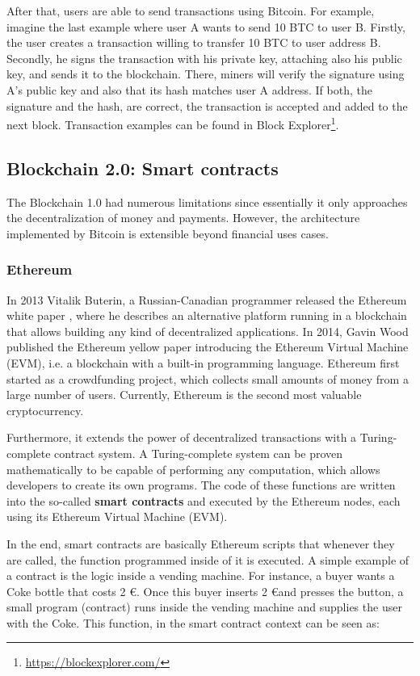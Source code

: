 After that, users are able to send transactions using Bitcoin. For example, imagine the last example where user A wants to send 10 BTC to user B. Firstly, the user creates a transaction willing to transfer 10 BTC to user address B. Secondly, he signs the transaction with his private key, attaching also his public key, and sends it to the blockchain. There, miners will verify the signature using A's public key and also that its hash matches user A address. If both, the signature and the hash, are correct, the transaction is accepted and added to the next block. Transaction examples can be found in Block Explorer\footnote{\url{https://blockexplorer.com/}}.

\subsection{Blockchain 2.0: Smart contracts} \label{smartContracts}

The Blockchain 1.0 had numerous limitations since essentially it only approaches the decentralization of money and payments. However, the architecture implemented by Bitcoin is extensible beyond financial uses cases.

\subsubsection{Ethereum}

In 2013 Vitalik Buterin, a Russian-Canadian programmer released the Ethereum white paper \cite{buterin2014next}, where he describes an alternative platform running in a blockchain that allows building any kind of decentralized applications. In 2014, Gavin Wood published the Ethereum
yellow paper introducing the Ethereum Virtual Machine (EVM), i.e. a blockchain with a built-in programming language. Ethereum first started as a crowdfunding project, which collects small amounts of money from a large number of users. Currently, Ethereum is the second most valuable cryptocurrency.

Furthermore, it extends the power of decentralized transactions with a Turing-complete contract system. A Turing-complete system can be proven mathematically to be capable of performing any computation, which allows developers to create its own programs. The code of these functions are written into the so-called \textbf{smart contracts} and executed by the Ethereum nodes, each using its Ethereum Virtual Machine (EVM).

In the end, smart contracts are basically Ethereum scripts that whenever they are called, the function programmed inside of it is executed. A simple example of a contract is the logic inside a vending machine. For instance, a buyer wants a Coke bottle that costs 2 \euro. Once this buyer inserts 2 \euro and presses the button, a small program (contract) runs inside the vending machine and supplies the user with the Coke. This function, in the smart contract context can be seen as:

